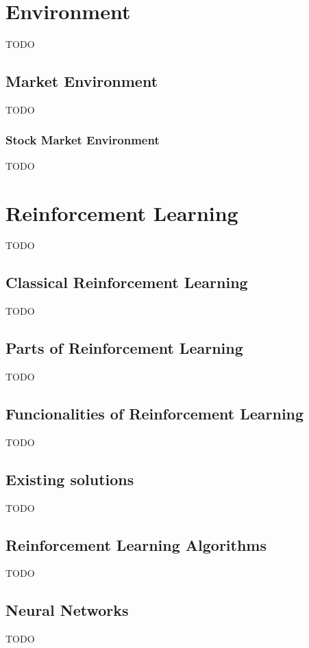 \chapter{Environment}
TODO


\section{Market Environment}
TODO

\subsection{Stock Market Environment}
TODO




\chapter{Reinforcement Learning}
TODO


\section{Classical Reinforcement Learning}
TODO


\section{Parts of Reinforcement Learning}
TODO


\section{Funcionalities of Reinforcement Learning}
TODO


\section{Existing solutions}
TODO


\section{Reinforcement Learning Algorithms}
TODO


\section{Neural Networks}
TODO


